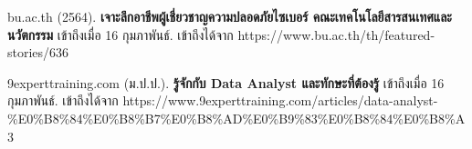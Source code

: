 \begin{thebibliography}{99}
bu.ac.th (2564). \textbf{เจาะลึกอาชีพผู้เชี่ยวชาญความปลอดภัยไซเบอร์ คณะเทคโนโลยีสารสนเทศและนวัตกรรม} เข้าถึงเมื่อ 16 กุมภาพันธ์. เข้าถึงได้จาก
https://www.bu.ac.th/th/featured-stories/636


9experttraining.com (ม.ป.ป.). \textbf{รู้จักกับ Data Analyst และทักษะที่ต้องรู้} เข้าถึงเมื่อ 16 กุมภาพันธ์. เข้าถึงได้จาก
https://www.9experttraining.com/articles/data-analyst-\%E0\%B8\%84\%E0\%B8\%B7\%E0\%B8\%AD\%E0\%B9\%83\%E0\%B8\%84\%E0\%B8\%A3
\end{thebibliography}